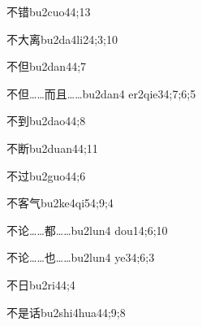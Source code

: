 \begin{verbete}{不错}{bu2cuo4}{4;13}
\end{verbete}

\begin{verbete}{不大离}{bu2da4li2}{4;3;10}
\end{verbete}

\begin{verbete}{不但}{bu2dan4}{4;7}
\end{verbete}

\begin{verbete}{不但……而且……}{bu2dan4 er2qie3}{4;7;6;5}
\end{verbete}

\begin{verbete}{不到}{bu2dao4}{4;8}
\end{verbete}

\begin{verbete}{不断}{bu2duan4}{4;11}
\end{verbete}

\begin{verbete}{不过}{bu2guo4}{4;6}
\end{verbete}

\begin{verbete}{不客气}{bu2ke4qi5}{4;9;4}
\end{verbete}

\begin{verbete}{不论……都……}{bu2lun4 dou1}{4;6;10}
\end{verbete}

\begin{verbete}{不论……也……}{bu2lun4 ye3}{4;6;3}
\end{verbete}

\begin{verbete}{不日}{bu2ri4}{4;4}
\end{verbete}

\begin{verbete}{不是话}{bu2shi4hua4}{4;9;8}
\end{verbete}

